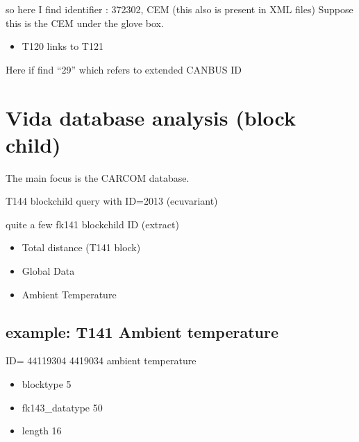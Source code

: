\documentclass[letterpaper,10pt,english]{sphinxmanual}
\begin{document}
\sphinxAtStartPar
so here I find identifier : 372302, CEM (this also is present in XML files)
Suppose this is the CEM under the glove box.
\begin{itemize}
\item {} 
\sphinxAtStartPar
T120 links to T121

\end{itemize}

\sphinxAtStartPar
Here if find “29” which refers to extended CANBUS ID

\noindent{}


\section{Vida database analysis (block child)}
\label{\detokenize{vidadatabase/block:vida-database-analysis-block-child}}\label{\detokenize{vidadatabase/block::doc}}
\sphinxAtStartPar
The main focus is the CARCOM database.

\sphinxAtStartPar
T144 blockchild
\sphinxhyphen{} query with ID=2013 (ecuvariant)

\sphinxAtStartPar
quite a few fk141 blockchild ID (extract)

\sphinxAtStartPar
{}
\begin{itemize}
\item {} 
 Total distance (T141 block)

\item {} 
 Global Data

\item {} 
 Ambient Temperature

\end{itemize}


\subsection{example: T141 Ambient temperature}
\label{\detokenize{vidadatabase/block:example-t141-ambient-temperature}}
\sphinxAtStartPar
ID= 44119304
4419034 ambient temperature
\begin{itemize}
\item {} 
\sphinxAtStartPar
blocktype 5

\item {} 
\sphinxAtStartPar
fk143\_datatype 50

\item {} 
\sphinxAtStartPar
length 16

\end{itemize}
\end{document}
